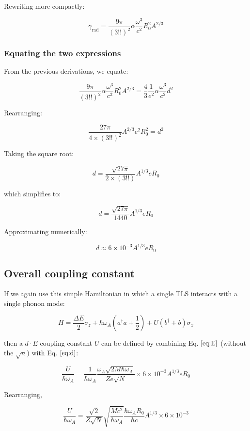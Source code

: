 \documentclass[
]{article}
\renewcommand{\[}{\begin{equation}}
\renewcommand{\]}{\end{equation}}
\begin{document}
Rewriting more compactly:

\[
\gamma_{\text{rad}} = \frac{9\pi}{(3!!)^2} \alpha \frac{\omega^3}{c^2} R_0^2 A^{2/3}
\]

\subsubsection{Equating the two
expressions}\label{equating-the-two-expressions}

From the previous derivations, we equate:

\[
\frac{9\pi}{(3!!)^2} \alpha \frac{\omega^3}{c^2} R_0^2 A^{2/3} = \frac{4}{3} \frac{1}{e^2} \alpha \frac{\omega^3}{c^2} d^2
\]

Rearranging:

\[
\frac{27\pi}{4 \times (3!!)^2} A^{2/3} e^2 R_0^2 = d^2
\]

Taking the square root:

\[
d = \frac{\sqrt{27\pi}}{2 \times (3!!)} A^{1/3} e R_0
\]

which simplifies to:

\[
d = \frac{\sqrt{27\pi}}{1440} A^{1/3} e R_0
\]

Approximating numerically:

\[
d \approx 6 \times 10^{-3} A^{1/3} e R_0 \label{eq:d}
\]

\subsection{Overall coupling
constant}\label{overall-coupling-constant-1}

If we again use this simple Hamiltonian in which a single TLS interacts
with a single phonon mode:

\[
H = \frac{\Delta E}{2} \sigma_z + \hbar\omega_A\left(a^{\dagger}a +\frac{1}{2}\right) + U\left( b^{\dagger} + b \right)\sigma_x
\]

then a \(d \cdot E\) coupling constant \(U\) can be defined by combining
Eq. \(\ref{eq:E}\) (without the \(\sqrt{n}\)) with Eq. \(\ref{eq:d}\):

\[
\frac{U}{\hbar \omega_A} = \frac{1}{\hbar \omega_A} \frac{\omega_A \sqrt{2M \hbar \omega_A}}{Ze \sqrt{N}} \times 6 \times 10^{-3} A^{1/3} e R_0
\]

Rearranging,

\[
\frac{U}{\hbar \omega_A} = \frac{\sqrt{2}}{Z \sqrt{N}} \sqrt{\frac{M c^2}{\hbar \omega_A}} \frac{\hbar \omega_A R_0}{\hbar c} A^{1/3} \times 6 \times 10^{-3}
\]
\end{document}
